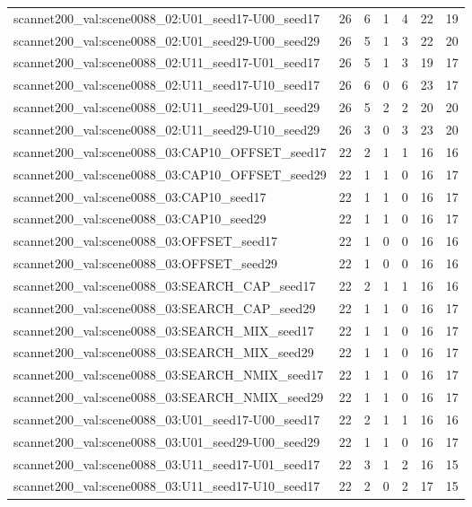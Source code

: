 \begin{table}[t]
\begin{tabular}{lrrrrrr}
scannet200\_val:scene0088\_02:U01\_seed17-U00\_seed17 & 26 & 6 & 1 & 4 & 22 & 19 \\
scannet200\_val:scene0088\_02:U01\_seed29-U00\_seed29 & 26 & 5 & 1 & 3 & 22 & 20 \\
scannet200\_val:scene0088\_02:U11\_seed17-U01\_seed17 & 26 & 5 & 1 & 3 & 19 & 17 \\
scannet200\_val:scene0088\_02:U11\_seed17-U10\_seed17 & 26 & 6 & 0 & 6 & 23 & 17 \\
scannet200\_val:scene0088\_02:U11\_seed29-U01\_seed29 & 26 & 5 & 2 & 2 & 20 & 20 \\
scannet200\_val:scene0088\_02:U11\_seed29-U10\_seed29 & 26 & 3 & 0 & 3 & 23 & 20 \\
scannet200\_val:scene0088\_03:CAP10\_OFFSET\_seed17 & 22 & 2 & 1 & 1 & 16 & 16 \\
scannet200\_val:scene0088\_03:CAP10\_OFFSET\_seed29 & 22 & 1 & 1 & 0 & 16 & 17 \\
scannet200\_val:scene0088\_03:CAP10\_seed17 & 22 & 1 & 1 & 0 & 16 & 17 \\
scannet200\_val:scene0088\_03:CAP10\_seed29 & 22 & 1 & 1 & 0 & 16 & 17 \\
scannet200\_val:scene0088\_03:OFFSET\_seed17 & 22 & 1 & 0 & 0 & 16 & 16 \\
scannet200\_val:scene0088\_03:OFFSET\_seed29 & 22 & 1 & 0 & 0 & 16 & 16 \\
scannet200\_val:scene0088\_03:SEARCH\_CAP\_seed17 & 22 & 2 & 1 & 1 & 16 & 16 \\
scannet200\_val:scene0088\_03:SEARCH\_CAP\_seed29 & 22 & 1 & 1 & 0 & 16 & 17 \\
scannet200\_val:scene0088\_03:SEARCH\_MIX\_seed17 & 22 & 1 & 1 & 0 & 16 & 17 \\
scannet200\_val:scene0088\_03:SEARCH\_MIX\_seed29 & 22 & 1 & 1 & 0 & 16 & 17 \\
scannet200\_val:scene0088\_03:SEARCH\_NMIX\_seed17 & 22 & 1 & 1 & 0 & 16 & 17 \\
scannet200\_val:scene0088\_03:SEARCH\_NMIX\_seed29 & 22 & 1 & 1 & 0 & 16 & 17 \\
scannet200\_val:scene0088\_03:U01\_seed17-U00\_seed17 & 22 & 2 & 1 & 1 & 16 & 16 \\
scannet200\_val:scene0088\_03:U01\_seed29-U00\_seed29 & 22 & 1 & 1 & 0 & 16 & 17 \\
scannet200\_val:scene0088\_03:U11\_seed17-U01\_seed17 & 22 & 3 & 1 & 2 & 16 & 15 \\
scannet200\_val:scene0088\_03:U11\_seed17-U10\_seed17 & 22 & 2 & 0 & 2 & 17 & 15 \\

\end{tabular}
\end{table}
